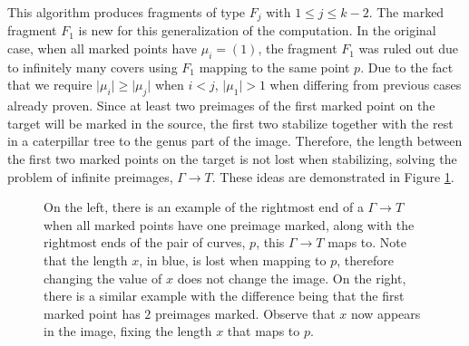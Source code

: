 \documentclass[11pt,reqno]{amsart}
\newcommand{\inputTikZ}[2]{%
     \resizebox{#1}{!}{}}
\theoremstyle{definition}
\begin{document}

This algorithm produces fragments of type $F_j$ with $1\leq j\leq k-2$. The marked fragment $F_1$ is new for this generalization of the computation. In the original case, when all marked points have $\mu_i=(1)$, the fragment $F_1$ was ruled out due to infinitely many covers using $F_1$ mapping to the same point $p$. Due to the fact that we require $\lvert\mu_i\rvert\geq \lvert \mu_j\rvert$ when $i<j$, $\lvert\mu_1\rvert>1$ when differing from previous cases already proven. Since at least two preimages of the first marked point on the target will be marked in the source, the first two stabilize together with the rest in a caterpillar tree to the genus part of the image. Therefore, the length between the first two marked points on the target is not lost when stabilizing, solving the problem of infinite preimages, $\Gamma\to T$. These ideas are demonstrated in Figure \ref{fig:F1}. 

\begin{figure}[tb]
    \centering
    \inputTikZ{\textwidth}{Figures/F1}
    \caption{On the left, there is an example of the rightmost end of a $\Gamma\to T$ when all marked points have one preimage marked, along with the rightmost ends of the pair of curves, $p$, this $\Gamma\to T$ maps to. Note that the length $x$, in blue, is lost when mapping to $p$, therefore changing the value of $x$ does not change the image. On the right, there is a similar example with the difference being that the first marked point has $2$ preimages marked. Observe that $x$ now appears in the image, fixing the length $x$ that maps to $p$.}
    \label{fig:F1}
\end{figure}
\end{document}
